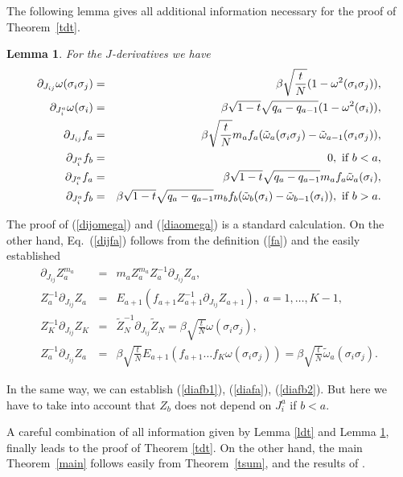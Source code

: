 \documentclass[a4paper,12pt]{article}
\newtheorem{lemma}{Lemma}
\begin{document}
The following lemma gives all additional information necessary for the 
proof of Theorem~\ref{tdt}.

\begin{lemma}
\label{ldJ}
For the $J$-derivatives we have
\begin{eqnarray}
\label{dijomega}
\partial_{J_{ij}}\omega(\sigma_i \sigma_j)&=&
\beta\sqrt{\frac{t}{N}}(1-\omega^{2}(\sigma_i \sigma_j)),\\
\label{diaomega}
\partial_{J_i^a}\omega(\sigma_i)&=&
\beta\sqrt{1-t}\sqrt{q_a-q_{a-1}}(1-\omega^{2}(\sigma_i)),\\
\label{dijfa}
\partial_{J_{ij}} f_a &=&
\beta\sqrt{\frac{t}{N}} m_a f_a (\tilde\omega_a(\sigma_i \sigma_j)-
\tilde\omega_{a-1}(\sigma_i \sigma_j)),\\
\label{diafb1}
\partial_{J_i^a} f_b &=& 0,\,\,\hbox{if $b<a$},\\
\label{diafa}
\partial_{J_i^a} f_a &=& 
\beta\sqrt{1-t}\sqrt{q_a-q_{a-1}} m_a f_a \tilde\omega_a(\sigma_i),\\   
\label{diafb2}
\partial_{J_i^a} f_b &=&
\beta\sqrt{1-t}\sqrt{q_a-q_{a-1}} m_b f_b (\tilde\omega_b(\sigma_i)-
\tilde\omega_{b-1}(\sigma_i)),\,\,\hbox{if $b>a$}.
\end{eqnarray}
\end{lemma}

The proof of (\ref{dijomega}) and (\ref{diaomega}) is a standard 
calculation. On the other hand, Eq.~(\ref{dijfa}) follows from the definition 
(\ref{fa}) and the easily established
\begin{eqnarray}
\nonumber
\partial_{J_{ij}} Z_{a}^{m_a} &=&
m_a Z_{a}^{m_a} Z_{a}^{-1} \partial_{J_{ij}} Z_a,\\
\nonumber
Z_{a}^{-1} \partial_{J_{ij}} Z_a &=&
E_{a+1}(f_{a+1} Z_{a+1}^{-1} \partial_{J_{ij}} 
Z_{a+1}),\,\,a=1,\dots,K-1,\\
\nonumber
Z_{K}^{-1} \partial_{J_{ij}} Z_K &=&
\tilde Z_{N}^{-1} \partial_{J_{ij}} \tilde Z_N=\beta\sqrt{\frac{t}{N}}
\omega(\sigma_i \sigma_j),\\
\nonumber
Z_{a}^{-1} \partial_{J_{ij}} Z_a &=&
\beta\sqrt{\frac{t}{N}}E_{a+1}(f_{a+1}\dots f_K \omega(\sigma_i \sigma_j))=
\beta\sqrt{\frac{t}{N}}\tilde\omega_a(\sigma_i \sigma_j).
\end{eqnarray}

In the same way, we can establish (\ref{diafb1}), (\ref{diafa}), 
(\ref{diafb2}). But here we have to take into account that $Z_b$ does not 
depend on $J^a_i$ if $b<a$.

A careful combination of all information given by Lemma \ref{ldt} and 
Lemma \ref{ldJ}, finally leads to the proof of  Theorem \ref{tdt}. On the 
other hand, the main Theorem~\ref{main} follows easily from 
Theorem~\ref{tsum}, and the results of \cite{GTthermo}.
\end{document}
